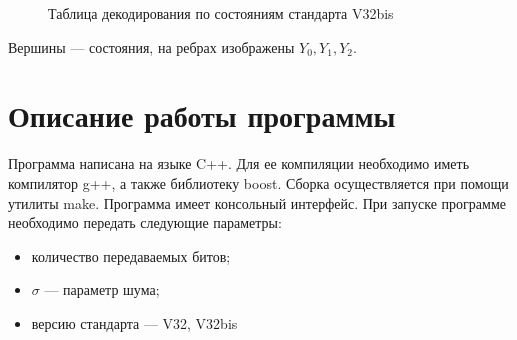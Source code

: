 \documentclass[a4paper,12pt]{article}
\begin{document}
\begin{figure}
	\caption{Таблица декодирования по состояниям стандарта V32bis}
	\label{decodeV32}
\end{figure}

Вершины --- состояния, на ребрах изображены $Y_0, Y_1, Y_2$.

\section{Описание работы программы}
Программа написана на языке C++. Для ее компиляции необходимо иметь компилятор g++, а также библиотеку boost. Сборка
осуществляется при помощи утилиты make. Программа имеет консольный интерфейс. При запуске программе необходимо передать 
следующие параметры:
\begin{itemize}
	\item количество передаваемых битов;
	\item $\sigma$ --- параметр шума;
	\item версию стандарта --- V32, V32bis
\end{itemize}
\end{document}
